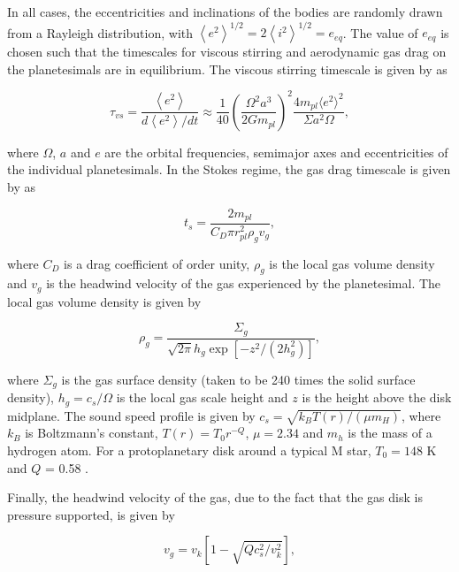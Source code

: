 \documentclass[twocolumn]{aastex63}
\begin{document}
In all cases, the eccentricities and inclinations of the bodies are randomly drawn from a Rayleigh distribution, with $\left< e^{2} \right>^{1/2} = 2\left<i^{2} \right>^{1/2} = e_{eq}$. The value of $e_{eq}$ is chosen such that the timescales for viscous stirring and aerodynamic gas drag on the planetesimals are in equilibrium. The viscous stirring timescale is given by \citet{ida93} as

\begin{equation}\label{eq:vs_timescale}
    \tau_{vs}  = \frac{\left< e^2 \right>}{d \left< e^2 \right> / dt} \approx \frac{1}{40}\left(\frac{\Omega^{2} a^{3}}{2 G m_{pl}}\right)^{2} \frac{4 m_{pl} \langle e^{2} \rangle^{2}}{\Sigma a^{2} \Omega},
\end{equation}

\noindent where $\Omega$, $a$ and $e$ are the orbital frequencies, semimajor axes and eccentricities of the individual planetesimals. In the Stokes regime, the gas drag timescale is given by \citet{adachi76} as

\begin{equation}\label{eq:ts_stokes}
    t_{s} = \frac{2 m_{pl}}{C_{D} \pi r_{pl}^{2} \rho_{g} v_{g}},
\end{equation}

\noindent where $C_{D}$ is a drag coefficient of order unity, $\rho_{g}$ is the local gas volume density and $v_{g}$ is the headwind velocity of the gas experienced by the planetesimal. The local gas volume density is given by

\begin{equation}\label{eq:rho_gas}
	\rho_{g} = \frac{\Sigma_{g}}{\sqrt{2 \pi} h_{g} \exp\left[ -z^{2} / \left( 2 h_{g}^{2} \right) \right]},
\end{equation}

\noindent where $\Sigma_{g}$ is the gas surface density (taken to be
240 times the solid surface density), $h_{g} = c_{s} / \Omega$ is the local gas scale height and $z$ is the height above the disk midplane. The sound speed profile is given by $c_{s} = \sqrt{k_{B} T(r) / \left( \mu m_{H} \right)}$, where $k_{B}$ is Boltzmann's constant, $T(r) = T_{0} r^{-Q}$, $\mu = 2.34$ and $m_{h}$ is the mass of a hydrogen atom. For a protoplanetary disk around a typical M star, $T_{0} = 148$ K and $Q$ = 0.58 \citep{andrews05}.

Finally, the headwind velocity of the gas, due to the fact that the gas disk is pressure supported, is given by

\begin{equation}\label{eq:v_gas}
	v_{g} = v_{k} \left[ 1 - \sqrt{ Q c_{s}^2 / v_{k}^2} \right],
\end{equation}
\end{document}
